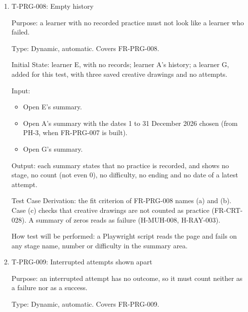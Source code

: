 \documentclass[12pt, titlepage]{article}
\newcommand{\testitem}[1]{\item #1\par\nopagebreak}
\begin{document}
\begin{enumerate}
Output: each case shows what its row says, with attempts with and without a
guide still separate as in T-PRG-003, and after every case the stored hash
of A's records still matches.

Test Case Derivation: the fit criterion of FR-PRG-007: choices change only
what is shown, records stay the same, and the two kinds stay separate. The
SRS says the summary covers all records until the adult chooses, (a). It
does not say whether a date range includes its end, so (f) checks only that
a figure and the records it opens agree (FR-PRG-005).

How test will be performed: a Playwright script makes each choice, reads the
summary as in T-PRG-002, and hashes the records afterwards.

\testitem{T-PRG-008: Empty history}

Purpose: a learner with no recorded practice must not look like a learner
who failed.

Type: Dynamic, automatic. Covers FR-PRG-008.

Initial State: learner E, with no records; learner A's history; a learner
G, added for this test, with three saved creative drawings and no attempts.

Input:
\begin{itemize}
\item[(a)] Open E's summary.
\item[(b)] Open A's summary with the dates 1 to 31 December 2026 chosen
(from PH-3, when FR-PRG-007 is built).
\item[(c)] Open G's summary.
\end{itemize}

Output: each summary states that no practice is recorded, and shows no
stage, no count (not even 0), no difficulty, no ending and no date of a
latest attempt.

Test Case Derivation: the fit criterion of FR-PRG-008 names (a) and (b). Case
(c) checks that creative drawings are not counted as practice (FR-CRT-028).
A summary of zeros reads as failure (H-MUH-008, H-RAY-003).

How test will be performed: a Playwright script reads the page and fails on
any stage name, number or difficulty in the summary area.

\testitem{T-PRG-009: Interrupted attempts shown apart}

Purpose: an interrupted attempt has no outcome, so it must count neither as
a failure nor as a success.

Type: Dynamic, automatic. Covers FR-PRG-009.


\end{enumerate}
\end{document}
